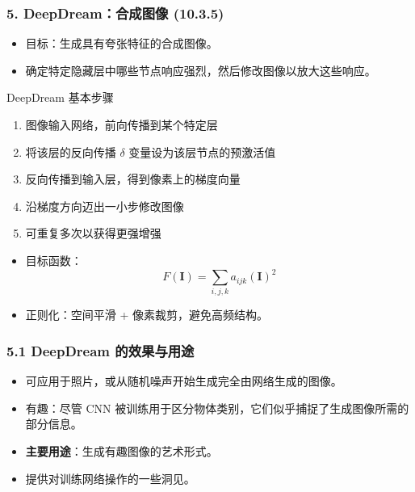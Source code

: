 \documentclass[t,aspectratio=169]{beamer} %
\begin{document}
\begin{frame}
    \frametitle{5. DeepDream：合成图像 (10.3.5)}
    \begin{itemize}
        \item 目标：生成具有\alert{夸张特征}的合成图像。
        \item 确定特定隐藏层中哪些节点响应强烈，然后修改图像以\alert{放大这些响应}。
    \end{itemize}
    \begin{block}{DeepDream 基本步骤}
        \begin{enumerate}
            \item 图像输入网络，前向传播到某个特定层
            \item 将该层的反向传播 $\delta$ 变量设为该层节点的\alert{预激活值}
            \item 反向传播到输入层，得到像素上的\alert{梯度向量}
            \item 沿梯度方向迈出一小步修改图像
            \item 可重复多次以获得更强增强
        \end{enumerate}
    \end{block}
    \begin{itemize}
        \item 目标函数：
        \begin{equation}
            F(\mathbf{I}) = \sum_{i,j,k} a_{ijk}(\mathbf{I})^2
            \tag{10.12}
        \end{equation}
        \item 正则化：\alert{空间平滑} + \alert{像素裁剪}，避免高频结构。
    \end{itemize}
\end{frame}

\begin{frame}
    \frametitle{5.1 DeepDream 的效果与用途}
    \begin{itemize}
        \item 可应用于照片，或从\alert{随机噪声}开始生成完全由网络生成的图像。
        \item 有趣：尽管 CNN 被训练用于\alert{区分}物体类别，它们似乎捕捉了\alert{生成}图像所需的部分信息。
        \item \textbf{主要用途}：生成有趣图像的艺术形式。
        \item 提供对训练网络操作的\alert{一些洞见}。
    \end{itemize}
\end{frame}
\end{document}

